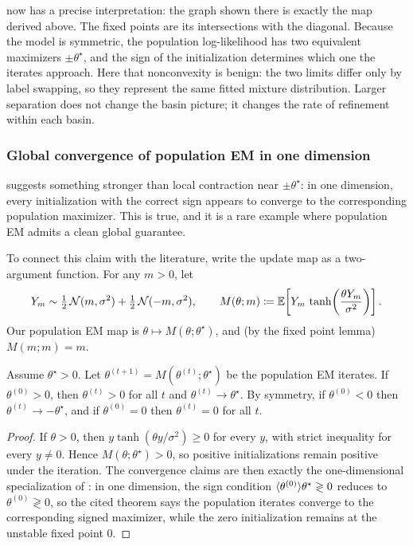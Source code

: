 \documentclass[11pt]{article}
\begin{document}
 now has a precise interpretation:
the graph shown there is exactly the map derived above.
The fixed points are its intersections with the diagonal.
Because the model is symmetric, the population log-likelihood has two equivalent maximizers $\pm\theta^\star$, and the sign of the initialization determines which one the iterates approach.
Here that nonconvexity is benign: the two limits differ only by label swapping, so they represent the same fitted mixture distribution.
Larger separation does not change the basin picture; it changes the rate of refinement within each basin.

\subsubsection{Global convergence of population EM in one dimension}
\label{subsubsec:gmm-global-population}

 suggests something stronger than local contraction near $\pm\theta^\star$: in one dimension, every initialization with the correct sign appears to converge to the corresponding population maximizer.
This is true, and it is a rare example where population EM admits a clean global guarantee.

To connect this claim with the literature, write the update map as a two-argument function.
For any $m>0$, let
\[
Y_m \sim \tfrac12\,\mathcal{N}(m,\sigma^2) + \tfrac12\,\mathcal{N}(-m,\sigma^2),
\qquad
M(\theta; m)\coloneqq \mathbb{E}\!\left[Y_m\,\tanh\!\left(\frac{\theta Y_m}{\sigma^2}\right)\right].
\]
Our population EM map is $\theta\mapsto M(\theta;\theta^\star)$, and (by the fixed point lemma) $M(m;m)=m$.

\begin{proposition}
\label{prop:gmm-global-population-sign-basin}
Assume $\theta^\star>0$.
Let $\theta^{(t+1)}=M(\theta^{(t)};\theta^\star)$ be the population EM iterates.
If $\theta^{(0)}>0$, then $\theta^{(t)}>0$ for all $t$ and $\theta^{(t)}\to \theta^\star$.
By symmetry, if $\theta^{(0)}<0$ then $\theta^{(t)}\to -\theta^\star$, and if $\theta^{(0)}=0$ then $\theta^{(t)}=0$ for all $t$.
\end{proposition}

\begin{proof}
If $\theta>0$, then $y\tanh(\theta y/\sigma^2)\ge 0$ for every $y$, with strict inequality for every $y\neq 0$.
Hence $M(\theta;\theta^\star)>0$, so positive initializations remain positive under the iteration.
The convergence claims are then exactly the one-dimensional specialization of \citet[Thms.~1--2]{xu_hsu_maleki_2016_global_em}: in one dimension, the sign condition $\langle\theta^{(0)}\rangle{\theta^\star}\gtrless 0$ reduces to $\theta^{(0)}\gtrless 0$, so the cited theorem says the population iterates converge to the corresponding signed maximizer, while the zero initialization remains at the unstable fixed point $0$.
\end{proof}
\end{document}
